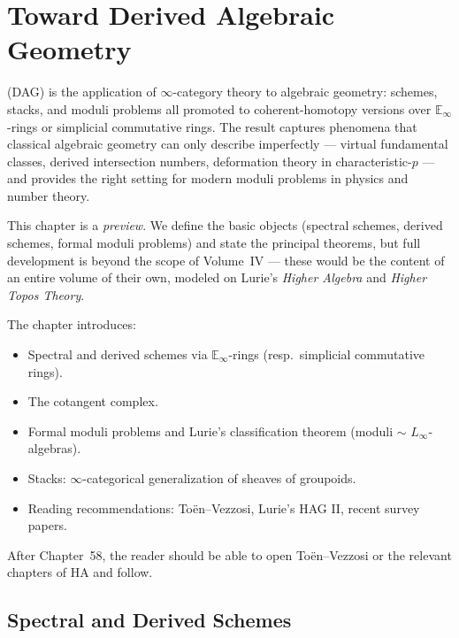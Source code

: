 
\chapter{Toward Derived Algebraic Geometry}

\begin{overviewbox}
 (DAG) is the application of
$\infty$-category theory to algebraic geometry: schemes, stacks, and
moduli problems all promoted to coherent-homotopy versions over
$\mathbb{E}_\infty$-rings or simplicial commutative rings. The result
captures phenomena that classical algebraic geometry can only describe
imperfectly — virtual fundamental classes, derived intersection
numbers, deformation theory in characteristic-$p$ — and provides the
right setting for modern moduli problems in physics and number theory.

This chapter is a \emph{preview}. We define the basic objects (spectral
schemes, derived schemes, formal moduli problems) and state the
principal theorems, but full development is beyond the scope of
Volume~IV — these would be the content of an entire volume of their
own, modeled on Lurie's \emph{Higher Algebra} and \emph{Higher Topos
Theory}.

The chapter introduces:
\begin{itemize}
  \item Spectral and derived schemes via $\mathbb{E}_\infty$-rings (resp.\
        simplicial commutative rings).
  \item The cotangent complex.
  \item Formal moduli problems and Lurie's classification theorem
        (moduli $\sim$ $L_\infty$-algebras).
  \item Stacks: $\infty$-categorical generalization of sheaves of
        groupoids.
  \item Reading recommendations: Toën–Vezzosi, Lurie's HAG II, recent
        survey papers.
\end{itemize}

After Chapter~58, the reader should be able to open Toën–Vezzosi or the
relevant chapters of HA and follow.
\end{overviewbox}


\section{Spectral and Derived Schemes}
\label{sec:spectral-derived}


